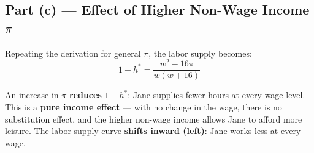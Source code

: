\documentclass[12pt]{article}
\begin{document}
\subsection*{Part (c) --- Effect of Higher Non-Wage Income $\pi$}

Repeating the derivation for general $\pi$, the labor supply becomes:
\[
    1 - h^* = \frac{w^2 - 16\pi}{w(w+16)}
\]

An increase in $\pi$ \textbf{reduces} $1-h^*$: Jane supplies fewer hours at
every wage level. This is a \textbf{pure income effect} --- with no change in
the wage, there is no substitution effect, and the higher non-wage income
allows Jane to afford more leisure. The labor supply curve \textbf{shifts
inward (left)}: Jane works less at every wage.
\end{document}

